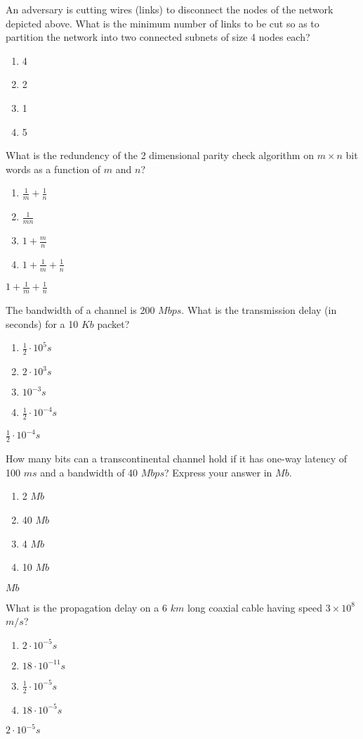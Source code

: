 \documentclass[a4 paper]{article}
\begin{document}
An adversary is cutting wires (links) to disconnect the nodes of the network depicted above. What is the minimum number of links to be cut so as to partition the network into two connected subnets of size 4 nodes each?
\begin{enumerate}
	\item 4
	\item 2
	\item 1
	\item 5
\end{enumerate}

What is the redundency of the 2 dimensional parity check algorithm on $m\times n$ bit words as a function of $m$ and $n$?
\begin{enumerate}
	\item $\frac{1}{m}+\frac{1}{n}$
	\item $\frac{1}{mn}$
	\item $1+\frac{m}{n}$
	\item $1+\frac{1}{m}+\frac{1}{n}$
\end{enumerate}
\solution $1+\frac{1}{m}+\frac{1}{n}$

The bandwidth of a channel is 200 $Mbps$. What is the transmission delay (in seconds) for a 10 $Kb$ packet?
\begin{enumerate}
	\item $\frac{1}{2}\cdot 10^{5} s$
	\item $2\cdot 10^{3} s$
	\item $10^{-3} s$
	\item $\frac{1}{2}\cdot 10^{-4} s$
\end{enumerate}
\solution $\frac{1}{2}\cdot 10^{-4} s$

How many bits can a transcontinental channel hold if it has one-way latency of 100 $ms$ and a bandwidth of 40 $Mbps$? Express your answer in $Mb$.
\begin{enumerate}
	\item 2 $Mb$
	\item 40 $Mb$
	\item 4 $Mb$
	\item 10 $Mb$
\end{enumerate}
 $Mb$

What is the propagation delay on a 6 $km$ long coaxial cable having speed $3\times10^{8}$ $m/s$?
\begin{enumerate}
	\item $2\cdot10^{-5} s$
	\item $18\cdot10^{-11} s$
	\item $\frac{1}{2}\cdot10^{-5} s$
	\item $18\cdot10^{-5} s$
\end{enumerate}
\solution $2\cdot10^{-5} s$
\end{document}
